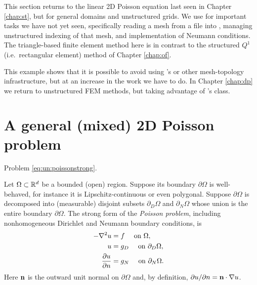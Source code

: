 
This section returns to the linear 2D Poisson equation last seen in Chapter \ref{chap:st}, but for general domains and unstructured grids.  We use \PETSc for important tasks we have not yet seen, specifically reading a mesh from a file into \PETSc \pVecs, managing unstructured indexing of that mesh, and implementation of Neumann conditions.  The triangle-based finite element method here is in contrast to the structured $Q^1$ (i.e.~rectangular element) method of Chapter \ref{chap:of}.

This example shows that it is possible to avoid using \PETSc's \pDMDA or other mesh-topology infrastructure, but at an increase in the work we have to do.  In Chapter \ref{chap:dp} we return to unstructured FEM methods, but taking advantage of \PETSc's \pDMPlex class.

\section{A general (mixed) 2D Poisson problem}

\begin{marginfigure}
\caption{Problem \eqref{eq:un:poissonstrong}.}
\label{fig:expcirclebasic}
\end{marginfigure}

Let $\Omega \subset \mathbb{R}^d$ be a bounded (open) region.  Suppose its boundary $\partial\Omega$ is well-behaved, for instance it is Lipschitz-continuous \citep[section 1.2]{Ciarlet2002} or even polygonal.  Suppose $\partial\Omega$ is decomposed into (measurable) disjoint subsets $\partial_D \Omega$ and $\partial_N \Omega$ whose union is the entire boundary $\partial \Omega$.  The strong form of the \emph{Poisson problem}, including nonhomogeneous Dirichlet and Neumann boundary conditions, is
\begin{align}
- \nabla^2 u &= f \quad \text{ on } \Omega, \label{eq:un:poissonstrong} \\
u &= g_D \quad \text{ on } \partial_D \Omega, \notag \\
\frac{\partial u}{\partial n} &= g_N \quad \text{ on } \partial_N \Omega. \notag
\end{align}
Here $\mathbf{n}$ is the outward unit normal on $\partial \Omega$ and, by definition, $\partial u/\partial n = \mathbf{n} \cdot \nabla u$.

